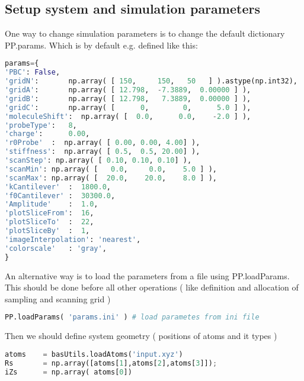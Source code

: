 \subsection{Setup system and simulation parameters}

One way to change simulation parameters is to change the default dictionary
PP.params. Which is by default e.g. defined like this:


\begin{shadedbox}
    \begin{lstlisting}[language=python]
params={
'PBC': False,
'gridN':       np.array( [ 150,     150,   50   ] ).astype(np.int32),
'gridA':       np.array( [ 12.798,  -7.3889,  0.00000 ] ),
'gridB':       np.array( [ 12.798,   7.3889,  0.00000 ] ),
'gridC':       np.array( [      0,        0,      5.0 ] ),
'moleculeShift':  np.array( [  0.0,      0.0,    -2.0 ] ),
'probeType':   8,
'charge':      0.00,
'r0Probe'  :  np.array( [ 0.00, 0.00, 4.00] ),
'stiffness':  np.array( [ 0.5,  0.5, 20.00] ),
'scanStep': np.array( [ 0.10, 0.10, 0.10] ),
'scanMin': np.array( [   0.0,     0.0,    5.0 ] ),
'scanMax': np.array( [  20.0,    20.0,    8.0 ] ),
'kCantilever'  :  1800.0,
'f0Cantilever' :  30300.0,
'Amplitude'    :  1.0,
'plotSliceFrom':  16,
'plotSliceTo'  :  22,
'plotSliceBy'  :  1,
'imageInterpolation': 'nearest',
'colorscale'   : 'gray',
}
   \end{lstlisting}
\end{shadedbox}

An alternative way is to load the parameters from a file using PP.loadParams.
This should be done before all other operations ( like definition and allocation
of sampling and scanning grid )




\begin{shadedbox}
    \begin{lstlisting}[language=python]
PP.loadParams( 'params.ini' ) # load parametes from ini file
   \end{lstlisting}
\end{shadedbox}


Then we should define system geometry ( positions of atoms and it types )
\begin{shadedbox}
    \begin{lstlisting}[language=python]
atoms    = basUtils.loadAtoms('input.xyz')
Rs       = np.array([atoms[1],atoms[2],atoms[3]]);
iZs      = np.array( atoms[0])
   \end{lstlisting}
\end{shadedbox}




